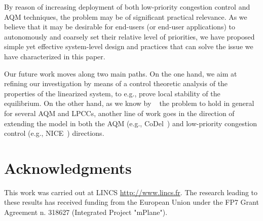\documentclass[conference]{IEEEtran}
\newcommand{\nice}[0]{NICE}
\begin{document}
By reason of increasing deployment of both low-priority congestion control and AQM techniques, the problem may be of significant practical relevance. As we believe that it may be desirable for end-users (or end-user applications) to autonomously and coarsely set their relative level of priorities, we have proposed simple yet effective system-level design and practices that can solve the issue we have characterized in this paper.

Our future work moves along two main paths. On the one hand, we aim at refining our investigation by means of a control theoretic analysis of the properties of the linearized system, to e.g., prove local stability of the equilibrium.
On the other hand, as we know by ~\cite{tma13} the problem to hold in general for several AQM and LPCCs, another line of work goes in the direction of extending the model in both the AQM (e.g., CoDel~\cite{codel}) and low-priority congestion control (e.g., \nice~\cite{tcp_nice}) directions. 

\section*{Acknowledgments}
This work was carried out at LINCS \url{http://www.lincs.fr}.  The research leading to these results has received funding from the European Union under the FP7 Grant Agreement n. 318627 (Integrated Project "mPlane").
\end{document}
